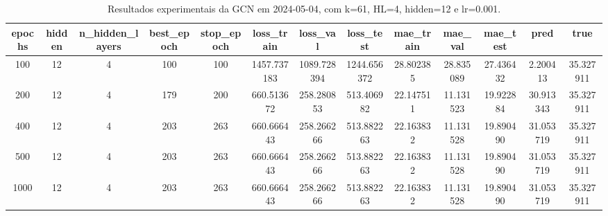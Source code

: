 \begin{table}[h]
\centering
\caption{Resultados experimentais da GCN em 2024-05-04, com k=61, HL=4, hidden=12 e lr=0.001.}
\label{tab:gcn_results_k61_hl4_h12_d20240504}
\begin{tabular}{ccccccccccccc}
\toprule
epochs & hidden & n\_hidden\_layers & best\_epoch & stop\_epoch & loss\_train & loss\_val & loss\_test & mae\_train & mae\_val & mae\_test & pred & true \\
\midrule
100 & 12 & 4 & 100 & 100 & 1457.737183 & 1089.728394 & 1244.656372 & 28.802385 & 28.835089 & 27.436432 & 2.200413 & 35.327911 \\
200 & 12 & 4 & 179 & 200 & 660.513672 & 258.280853 & 513.406982 & 22.147511 & 11.131523 & 19.922884 & 30.913343 & 35.327911 \\
400 & 12 & 4 & 203 & 263 & 660.666443 & 258.266266 & 513.882263 & 22.163832 & 11.131528 & 19.890490 & 31.053719 & 35.327911 \\
500 & 12 & 4 & 203 & 263 & 660.666443 & 258.266266 & 513.882263 & 22.163832 & 11.131528 & 19.890490 & 31.053719 & 35.327911 \\
1000 & 12 & 4 & 203 & 263 & 660.666443 & 258.266266 & 513.882263 & 22.163832 & 11.131528 & 19.890490 & 31.053719 & 35.327911 \\
\bottomrule
\end{tabular}
\end{table}
